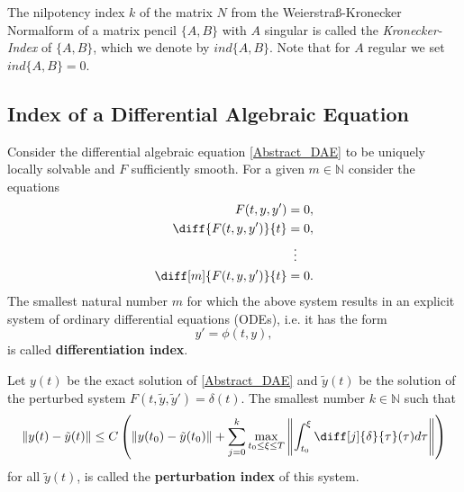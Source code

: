 	\begin{frame}
		\begin{definition}
			The nilpotency index $k$ of the matrix $N$ from the Weierstraß-Kronecker Normalform of a matrix pencil $\{A,B\}$ with $A$ singular is called the \emph{Kronecker-Index} of $\{A,B\}$, which we denote by $ind\{A,B\}$. Note that for $A$ regular we set $ind\{A,B\} = 0$.
		\end{definition}
	\end{frame}
	
	
	
	\subsection{Index of a Differential Algebraic Equation}
	
	\begin{frame}
		\begin{definition}%
			Consider the differential algebraic equation \eqref{Abstract_DAE} to be uniquely locally solvable and $F$ sufficiently smooth. For a given $m \in \mathbb{N}$ consider the equations
			\begin{displaymath}
				\begin{aligned}
					F(t,y,y') &= 0, \\
					\diff{F(t,y,y')}{t} &= 0, \\
					&\vdotswithin{=} \\
					\diff[m]{F(t,y,y')}{t} &= 0.
				\end{aligned}
			\end{displaymath}
			The smallest natural number $m$ for which the above system results in an explicit system of ordinary differential equations (ODEs), i.e. it has the form
			\begin{displaymath}
				y' = \phi(t,y),
			\end{displaymath}
			is called \textbf{differentiation index}.
		\end{definition}
	\end{frame}

	\begin{frame}
		\begin{definition}%
			Let $y(t)$ be the exact solution of \eqref{Abstract_DAE} and $\tilde{y}(t)$ be the solution of the perturbed system $F(t, \tilde{y}, \tilde{y}') = \delta(t)$. The smallest number $k \in \mathbb{N}$ such that 
			\begin{displaymath}
				\|y(t)-\tilde{y}(t)\| \leq C \left(\|y(t_0)-\tilde{y}(t_0)\|+\sum_{j=0}^{k}\max_{t_0 \leq \xi \leq T} \left\rVert 		\int_{t_0}^{\xi}\diff[j]{\delta}{\tau}(\tau)d \tau \right\rVert \right)
			\end{displaymath}
			for all $\tilde{y}(t)$, is called the \textbf{perturbation index} of this system.
		\end{definition}
	\end{frame}

